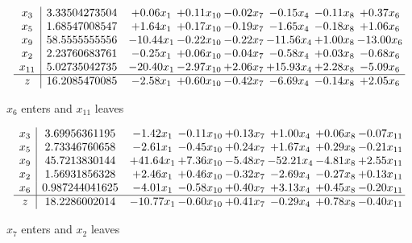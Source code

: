 \documentclass[8pt]{article}
\begin{document}
 \[\begin{array}{c| c c@{\hskip 2pt} c@{\hskip 2pt} c@{\hskip 2pt} c@{\hskip 2pt} c@{\hskip 2pt} c@{\hskip 2pt} }
 x_{3}   &  3.33504273504 & +  0.06 x_{1} & +  0.11 x_{10} & -0.02 x_{7} & -0.15 x_{4} & -0.11 x_{8} & +  0.37 x_{6}\\
 x_{5}   &  1.68547008547 & +  1.64 x_{1} & +  0.17 x_{10} & -0.19 x_{7} & -1.65 x_{4} & -0.18 x_{8} & +  1.06 x_{6}\\
 x_{9}   &  58.5555555556 & -10.44 x_{1} & -0.22 x_{10} & -0.22 x_{7} & -11.56 x_{4} & +  1.00 x_{8} & -13.00 x_{6}\\
 x_{2}   &  2.23760683761 & -0.25 x_{1} & +  0.06 x_{10} & -0.04 x_{7} & -0.58 x_{4} & +  0.03 x_{8} & -0.68 x_{6}\\
 x_{11}   &  5.02735042735 & -20.40 x_{1} & -2.97 x_{10} & +  2.06 x_{7} & + 15.93 x_{4} & +  2.28 x_{8} & -5.09 x_{6}\\
\hline
z    &  16.2085470085 & -2.58 x_{1} & +  0.60 x_{10} & -0.42 x_{7} & -6.69 x_{4} & -0.14 x_{8} & +  2.05 x_{6}\\
\end{array}\]


 $ x_{6} $ enters and $ x_{11} $ leaves 

 \[\begin{array}{c| c c@{\hskip 2pt} c@{\hskip 2pt} c@{\hskip 2pt} c@{\hskip 2pt} c@{\hskip 2pt} c@{\hskip 2pt} }
 x_{3}   &  3.69956361195 & -1.42 x_{1} & -0.11 x_{10} & +  0.13 x_{7} & +  1.00 x_{4} & +  0.06 x_{8} & -0.07 x_{11}\\
 x_{5}   &  2.73346760658 & -2.61 x_{1} & -0.45 x_{10} & +  0.24 x_{7} & +  1.67 x_{4} & +  0.29 x_{8} & -0.21 x_{11}\\
 x_{9}   &  45.7213830144 & + 41.64 x_{1} & +  7.36 x_{10} & -5.48 x_{7} & -52.21 x_{4} & -4.81 x_{8} & +  2.55 x_{11}\\
 x_{2}   &  1.56931856328 & +  2.46 x_{1} & +  0.46 x_{10} & -0.32 x_{7} & -2.69 x_{4} & -0.27 x_{8} & +  0.13 x_{11}\\
 x_{6}   &  0.987244041625 & -4.01 x_{1} & -0.58 x_{10} & +  0.40 x_{7} & +  3.13 x_{4} & +  0.45 x_{8} & -0.20 x_{11}\\
\hline
z    &  18.2286002014 & -10.77 x_{1} & -0.60 x_{10} & +  0.41 x_{7} & -0.29 x_{4} & +  0.78 x_{8} & -0.40 x_{11}\\
\end{array}\]


 $ x_{7} $ enters and $ x_{2} $ leaves 
\end{document}
